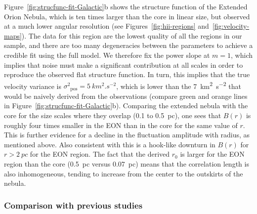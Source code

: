 \documentclass[fleqn,usenatbib, useAMS, a4paper]{mnras}
\newcommand\startNEW{\color{black}}
\newcommand\stopNEW{\color{black}}
\newcommand\pos{\ensuremath{_{\mathrm{pos}}}}
\begin{document}
Figure~\ref{fig:strucfunc-fit-Galactic}b shows the structure function of the Extended Orion Nebula, which is ten times larger than the core in linear size,
but observed at a much lower angular resolution
(see Figures~\ref{fig:hii-regions} and~\ref{fig:velocity-maps}).
The data for this region are the lowest quality of all the regions in
our sample, and there are too many degeneracies between the parameters
to achieve a credible fit using the full model.
We therefore fix the power slope at \(m = 1\),
which implies that noise must make a significant contribution at all scales
in order to reproduce the observed flat structure function.
In turn, this implies that
\startNEW
the true velocity variance is
\stopNEW
\(\sigma^2\pos = \SI{5}{km^2.s^{-2}}\),
which is lower than the \SI{7}{km^2.s^{-2}}
that would be naively derived from the observations
(compare green and orange lines in Figure~\ref{fig:strucfunc-fit-Galactic}b).
\startNEW
Comparing the extended nebula with the core for the size scales where they overlap
(\num{0.1} to \SI{0.5}{pc}), one sees that \(B(r)\) is roughly four times smaller
in the EON than in the core for the same value of \(r\).
This is further evidence for a decline in the fluctuation amplitude with radius,
as mentioned above.
Also consistent with this is a hook-like downturn in \(B(r)\) for \(r > \SI{2}{pc}\)
for the EON region.
The fact that the derived \(r_0\) is larger for the EON region than the core
(\SI{0.5}{pc} versus \SI{0.07}{pc}) means that the correlation length is also inhomogeneous,
tending to increase from the center to the outskirts of the nebula. 
\stopNEW

\startNEW
\subsubsection{Comparison with previous studies}
\label{sec:comparison-orion}
\stopNEW
\end{document}
